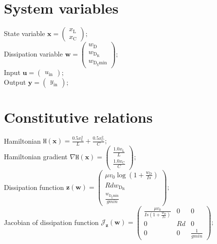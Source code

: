 \documentclass[11pt, oneside]{article}      %
\begin{document}
\section{System variables}
%
State variable $ \mathbf{x} = \left(\begin{array}{c}x_{\mathrm{L}}\\x_{\mathrm{C}}\end{array}\right) ; $ 
%
\\
%
Dissipation variable $ \mathbf{w} = \left(\begin{array}{c}w_{\mathrm{D}}\\w_{\mathrm{D_R}}\\w_{\mathrm{D_gmin}}\end{array}\right) ; $ 
%
\\
%
Input $ \mathbf{u} = \left(\begin{array}{c}u_{\mathrm{in}}\end{array}\right) ; $ 
%
\\
%
Output $ \mathbf{y} = \left(\begin{array}{c}y_{\mathrm{in}}\end{array}\right) ; $ 
%
\\
%
%
\section{Constitutive relations}
%
Hamiltonian $ \mathtt{H}(\mathbf{x}) = \frac{0.5 x_{\mathrm{L}}^{2}}{L} + \frac{0.5 x_{\mathrm{C}}^{2}}{C} ; $ 
%
\\
%
Hamiltonian gradient $ \nabla \mathtt{H}(\mathbf{x}) = \left(\begin{array}{c}\frac{1.0 x_{\mathrm{L}}}{L}\\\frac{1.0 x_{\mathrm{C}}}{C}\end{array}\right) ; $ 
%
\\
%
Dissipation function $ \mathbf{z}(\mathbf{w}) = \left(\begin{array}{c}\mu v_{0} \log{\left (1 + \frac{w_{\mathrm{D}}}{Is} \right )}\\Rd w_{\mathrm{D_R}}\\\frac{w_{\mathrm{D_gmin}}}{gmin}\end{array}\right) ; $ 
%
\\
%
Jacobian of dissipation function $ \mathcal{J}_{\mathbf{z}}(\mathbf{w}) = \left(\begin{array}{ccc}\frac{\mu v_{0}}{Is \left(1 + \frac{w_{\mathrm{D}}}{Is}\right)} & 0 & 0\\0 & Rd & 0\\0 & 0 & \frac{1}{gmin}\end{array}\right) ; $ 
%
\\
%
%
\end{document}
